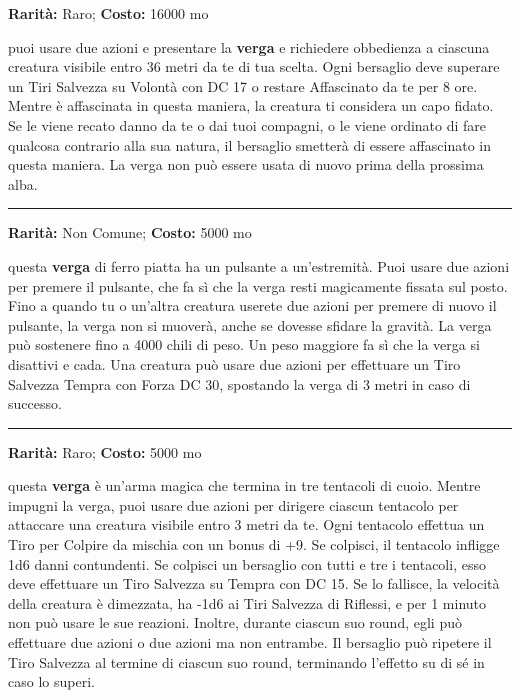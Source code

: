 \begin{multicols}{2}
\textbf{Rarità:} Raro; \textbf{Costo:} 16000 mo

puoi usare due azioni e presentare la \textbf{verga} e richiedere obbedienza a ciascuna creatura visibile entro 36 metri da te di tua scelta. Ogni bersaglio deve superare un Tiri Salvezza su Volontà con DC 17 o restare Affascinato da te per 8 ore. Mentre è affascinata in questa maniera, la creatura ti considera un capo fidato. Se le viene recato danno da te o dai tuoi compagni, o le viene ordinato di fare qualcosa contrario alla sua natura, il bersaglio smetterà di essere affascinato in questa maniera. La verga non può essere usata di nuovo prima della prossima alba.

\smallskip\noindent\rule{\linewidth}{2pt}  \hypertarget{VergaInamovibile}{}\medskip{}\noindent\label{VergaInamovibile}

\textbf{Rarità:} Non Comune; \textbf{Costo:} 5000 mo

questa \textbf{verga} di ferro piatta ha un pulsante a un'estremità. Puoi usare due azioni per premere il pulsante, che fa sì che la verga resti magicamente fissata sul posto. Fino a quando tu o un'altra creatura userete due azioni per premere di nuovo il pulsante, la verga non si muoverà, anche se dovesse sfidare la gravità. La verga può sostenere fino a 4000 chili di peso. Un peso maggiore fa sì che la verga si disattivi e cada. Una creatura può usare due azioni per effettuare un Tiro Salvezza Tempra con Forza DC 30, spostando la verga di 3 metri in caso di successo.

\smallskip\noindent\rule{\linewidth}{2pt}  \hypertarget{VergaTentacolare}{}\medskip{}\noindent\label{VergaTentacolare}

\textbf{Rarità:} Raro; \textbf{Costo:} 5000 mo

questa \textbf{verga} è un'arma magica che termina in tre tentacoli di cuoio. Mentre impugni la verga, puoi usare due azioni per dirigere ciascun tentacolo per attaccare una creatura visibile entro 3 metri da te. Ogni tentacolo effettua un Tiro per Colpire da mischia con un bonus di +9. Se colpisci, il tentacolo infligge 1d6 danni contundenti. Se colpisci un bersaglio con tutti e tre i tentacoli, esso deve effettuare un Tiro Salvezza su Tempra con DC 15. Se lo fallisce, la velocità della creatura è dimezzata, ha -1d6 ai Tiri Salvezza di Riflessi, e per 1 minuto non può usare le sue reazioni. Inoltre, durante ciascun suo round, egli può effettuare due azioni o due azioni ma non entrambe. Il bersaglio può ripetere il Tiro Salvezza al termine di ciascun suo round, terminando l'effetto su di sé in caso lo superi.



\end{multicols}
